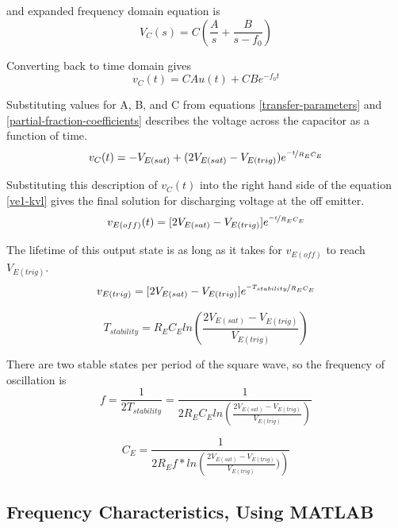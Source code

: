\documentclass[titlepage, letterpaper, 10.5pt]{article}
\begin{document}
and expanded frequency domain equation is
\begin{equation}
V_{C}(s)=C\left(\frac{A}{s}+\frac{B}{s-f_{0}}\right)
\end{equation}

Converting back to time domain gives
\begin{equation*}
v_{C}(t)=CAu(t)+CBe^{-f_{0}t}
\end{equation*}

Substituting values for A, B, and C from equations
\ref{transfer-parameters} and \ref{partial-fraction-coefficients}
describes the voltage across the capacitor as a function of time.
\begin{equation*}
v_{C}(t)=-V_{E(sat)}+(2V_{E(sat)}-V_{E(trig)})e^{\nicefrac{-t}{R_{E}C_{E}}}
\end{equation*}

Substituting this description of $v_{C}(t)$ into the right hand side of
the equation \ref{ve1-kvl} gives the final solution for discharging voltage
at the off emitter.
\begin{equation}
v_{E(off)}(t)=[2V_{E(sat)}-V_{E(trig)}]e^{\nicefrac{-t}{R_{E}C_{E}}}
\end{equation}

The lifetime of this output state is as long as it takes for $v_{E(off)}$ to reach $V_{E(trig)}$.
\begin{equation*}
v_{E(trig)}=[2V_{E(sat)}-V_{E(trig)}]e^{\nicefrac{-T_{stability}}{R_{E}C_{E}}}
\end{equation*}

\begin{equation*}
T_{stability}=R_{E}C_{E}ln\left(\frac{2V_{E(sat)}-V_{E(trig)}}{V_{E(trig)}}\right)
\end{equation*}

There are two stable states per period of the square wave, so the frequency of oscillation is
\begin{equation}
f=\frac{1}{2T_{stability}}=\frac{1}{2R_{E}C_{E}ln\left(\frac{2V_{E(sat)}-V_{E(trig)}}{V_{E(trig)}}\right)}
\label{f-eq}
\end{equation}

\begin{equation}
C_{E}=\frac{1}{2R_{E}f*ln\left(\frac{2V_{E(sat)}-V_{E(trig)}}{V_{E(trig)}})\right)}
\label{ce-eq}
\end{equation}

\clearpage
\subsection{Frequency Characteristics, Using MATLAB}
\end{document}
